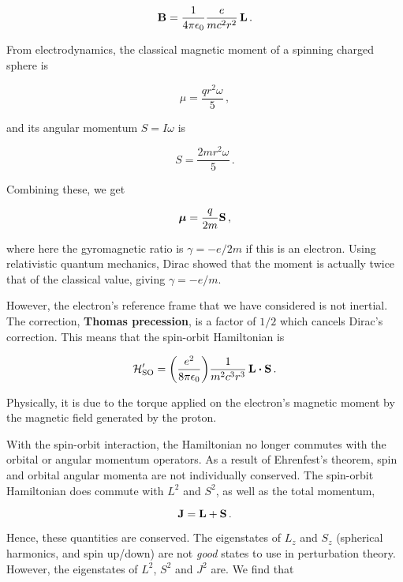 \documentclass[12pt, titlepage]{article}
\begin{document}
\begin{equation}
	\vb{B} = \frac{1}{4\pi\epsilon_0}\frac{e}{mc^2r^2}\,\vb{L} \,.
\end{equation}

From electrodynamics, the classical magnetic moment of a spinning charged sphere is 

\begin{equation}
	\mu = \frac{qr^2\omega}{5} \,,
\end{equation}

and its angular momentum $S = I\omega$ is

\begin{equation}
	S = \frac{2mr^2\omega}{5} \,.
\end{equation}

Combining these, we get 

\begin{equation}
	\vb*{\mu} = \frac{q}{2m}\vb{S} \,,
\end{equation}

where here the gyromagnetic ratio is $\gamma = -e/2m$ if this is an electron. Using relativistic quantum mechanics, Dirac showed that the moment is actually twice that of the classical value, giving $\gamma=-e/m$.

However, the electron's reference frame that we have considered is not inertial. The correction, \textbf{Thomas precession}, is a factor of $1/2$ which cancels Dirac's correction. This means that the spin-orbit Hamiltonian is

\begin{equation}
	\mathcal{H}_{\text{SO}}^\prime = \qty(\frac{e^2}{8\pi\epsilon_0})\frac{1}{m^2c^3r^3}\,\vb{L}\vdot\vb{S} \,.
\end{equation}

Physically, it is due to the torque applied on the electron's magnetic moment by the magnetic field generated by the proton.

With the spin-orbit interaction, the Hamiltonian no longer commutes with the orbital or angular momentum operators. As a result of Ehrenfest's theorem, spin and orbital angular momenta are not individually conserved. The spin-orbit Hamiltonian does commute with $L^2$ and $S^2$, as well as the total momentum,

\begin{equation}
	\vb{J} = \vb{L} + \vb{S} \,.
\end{equation}

Hence, these quantities are conserved. The eigenstates of $L_z$ and $S_z$ (spherical harmonics, and spin up/down) are not \textit{good} states to use in perturbation theory. However, the eigenstates of $L^2$, $S^2$ and $J^2$ are. We find that
\end{document}
